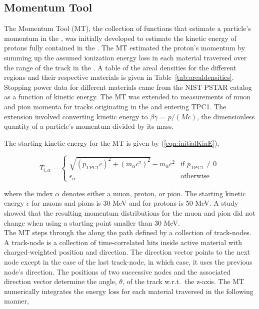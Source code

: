 \subsection{Momentum Tool}

The Momentum Tool (MT), the collection of functions that estimate a
particle's momentum in the \podtext{}, was initially developed to estimate
the kinetic energy of protons fully contained in the \podtext{}. The MT
estimated the proton's momentum by summing up the assumed ionization
energy loss in each material traversed over the range of the track in
the \podtext{}. A table of the areal densities for the different \podtext{}
regions and their respective materials is given in
Table~\ref{tab:arealdensities}. Stopping power data for different materials
came from the NIST PSTAR catalog as a function of kinetic
energy. The MT was extended to
measurements of muon and pion momenta for tracks originating in the
\podtext{} and entering TPC1.  The extension involved converting kinetic
energy to $\beta\gamma$ = $p/(Mc)$, the dimensionless quantity of a
particle's momentum divided by its mass.

The starting kinetic energy for the MT is given by (\ref{eqn:initialKinE}),

\begin{equation}\label{eqn:initialKinE}
    T_{i,\alpha} =
        \begin{cases}
            \sqrt{{(p_\text{TPC1}c)}^2 + {(m_\alpha c^2)}^2} - m_\alpha c^2 &\mbox{if }p_\text{TPC1} \neq 0 \,\\
            \epsilon_\alpha &\mbox{otherwise} \,
        \end{cases}
\end{equation}

\noindent{}where the index $\alpha$ denotes either a muon, proton, or
pion. The starting kinetic energy $\epsilon$ for muons and pions is 30
MeV and for protons is 50 MeV. A study showed that the resulting momentum
distributions for the muon and pion did not change when using a starting point smaller than
30 MeV. \\

The MT steps through the \podtext{} along the path defined by a collection of track-nodes.
A track-node is a collection of time-correlated hits inside active material
with charged-weighted position and direction. The direction vector points to
the next node except in the case of the last track-node, in which case, it uses
the previous node's direction. The positions of two successive nodes and
the associated direction vector determine the angle, $\theta$, of the
track w.r.t.~the \podtext{} z-axis. The MT numerically integrates the energy
loss for each material traversed in the following manner,

